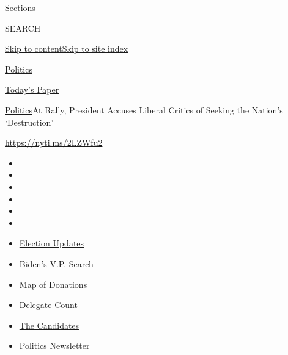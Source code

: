 Sections

SEARCH

\protect\hyperlink{site-content}{Skip to
content}\protect\hyperlink{site-index}{Skip to site index}

\href{https://www.nytimes.com/section/politics}{Politics}

\href{https://myaccount.nytimes.com/auth/login?response_type=cookie\&client_id=vi}{}

\href{https://www.nytimes.com/section/todayspaper}{Today's Paper}

\href{/section/politics}{Politics}\textbar{}At Rally, President Accuses
Liberal Critics of Seeking the Nation's `Destruction'

\url{https://nyti.ms/2LZWfu2}

\begin{itemize}
\item
\item
\item
\item
\item
\item
\end{itemize}

\begin{itemize}
\item
  \href{https://www.nytimes.com/2020/07/31/us/elections/biden-vs-trump.html?action=click\&pgtype=Article\&state=default\&region=TOP_BANNER\&context=storylines_menu}{Election
  Updates}
\item
  \href{https://www.nytimes.com/article/biden-vice-president-2020.html?action=click\&pgtype=Article\&state=default\&region=TOP_BANNER\&context=storylines_menu}{Biden's
  V.P. Search}
\item
  \href{https://www.nytimes.com/interactive/2020/07/24/us/politics/trump-biden-campaign-donors.html?action=click\&pgtype=Article\&state=default\&region=TOP_BANNER\&context=storylines_menu}{Map
  of Donations}
\item
  \href{https://www.nytimes.com/interactive/2020/us/elections/delegate-count-primary-results.html?action=click\&pgtype=Article\&state=default\&region=TOP_BANNER\&context=storylines_menu}{Delegate
  Count}
\item
  \href{https://www.nytimes.com/interactive/2019/us/politics/2020-presidential-candidates.html?action=click\&pgtype=Article\&state=default\&region=TOP_BANNER\&context=storylines_menu}{The
  Candidates}
\item
  \href{https://www.nytimes.com/newsletters/politics?action=click\&pgtype=Article\&state=default\&region=TOP_BANNER\&context=storylines_menu}{Politics
  Newsletter}
\end{itemize}

